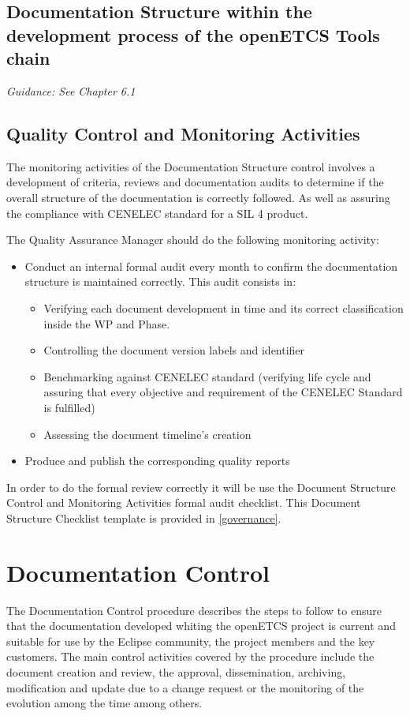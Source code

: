 \documentclass{template/openetcs_article}
\begin{document}
\subsection{Documentation Structure within the development process of the openETCS Tools chain}
\textit{Guidance: See Chapter 6.1}


\subsection{Quality Control and Monitoring Activities}
The monitoring activities of the Documentation Structure control involves a development of  criteria, reviews and documentation audits to determine if the overall structure of the documentation is correctly followed. As well as assuring the compliance with CENELEC standard for a SIL 4 product.

The Quality Assurance Manager should do the following monitoring activity:
\begin{itemize}
\item Conduct an internal formal audit every month to confirm the documentation structure is maintained correctly. This audit consists in:
\begin{itemize}
\item Verifying each document development in time and its correct classification inside the WP and Phase.
\item Controlling the document version labels and identifier
\item Benchmarking against CENELEC standard (verifying life cycle and assuring that every objective and requirement of the CENELEC Standard is fulfilled)
\item Assessing the document timeline’s creation
\end{itemize}
\item Produce and publish the corresponding quality reports
\end{itemize}

In order to do the formal review correctly it will be use the Document  Structure Control and Monitoring Activities formal audit checklist. This Document Structure Checklist template is provided in \href{https://github.com/openETCS/governance/tree/master/Templates}{[governance]}.

\section{Documentation Control}
The Documentation Control procedure describes the steps to follow to ensure that the documentation developed whiting the openETCS project is current and suitable for use by the Eclipse community, the project members and the key customers. The main control activities covered by the procedure include the document creation and review, the approval, dissemination, archiving, modification and update due to a change request or the monitoring of the evolution among the time among others.
\end{document}
